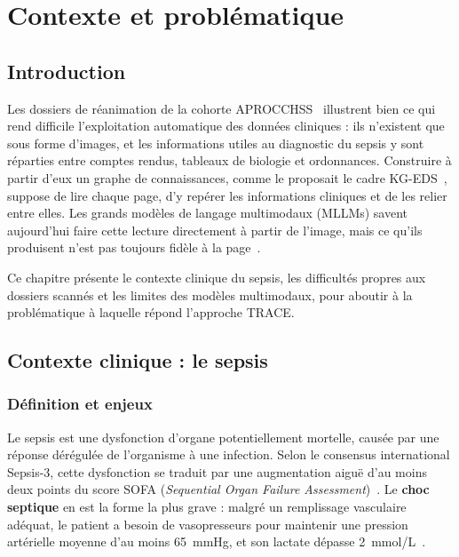 \chapter{Contexte et problématique}\label{chap:contexte}

\section{Introduction}

Les dossiers de réanimation de la cohorte APROCCHSS~\cite{annane2018aprocchss} illustrent bien ce qui rend difficile l'exploitation automatique des données cliniques : ils n'existent que sous forme d'images, et les informations utiles au diagnostic du sepsis y sont réparties entre comptes rendus, tableaux de biologie et ordonnances. Construire à partir d'eux un graphe de connaissances, comme le proposait le cadre KG-EDS~\cite{kgeds}, suppose de lire chaque page, d'y repérer les informations cliniques et de les relier entre elles. Les grands modèles de langage multimodaux (MLLMs) savent aujourd'hui faire cette lecture directement à partir de l'image, mais ce qu'ils produisent n'est pas toujours fidèle à la page~\cite{bai2025survey}.

Ce chapitre présente le contexte clinique du sepsis, les difficultés propres aux dossiers scannés et les limites des modèles multimodaux, pour aboutir à la problématique à laquelle répond l'approche TRACE.

\section{Contexte clinique : le sepsis}

\subsection{Définition et enjeux}

Le sepsis est une dysfonction d'organe potentiellement mortelle, causée par une réponse dérégulée de l'organisme à une infection. Selon le consensus international Sepsis-3, cette dysfonction se traduit par une augmentation aiguë d'au moins deux points du score SOFA (\textit{Sequential Organ Failure Assessment})~\cite{singer2016third,vincent1996sofa}. Le \textbf{choc septique} en est la forme la plus grave : malgré un remplissage vasculaire adéquat, le patient a besoin de vasopresseurs pour maintenir une pression artérielle moyenne d'au moins 65~mmHg, et son lactate dépasse 2~mmol/L~\cite{singer2016third}.

